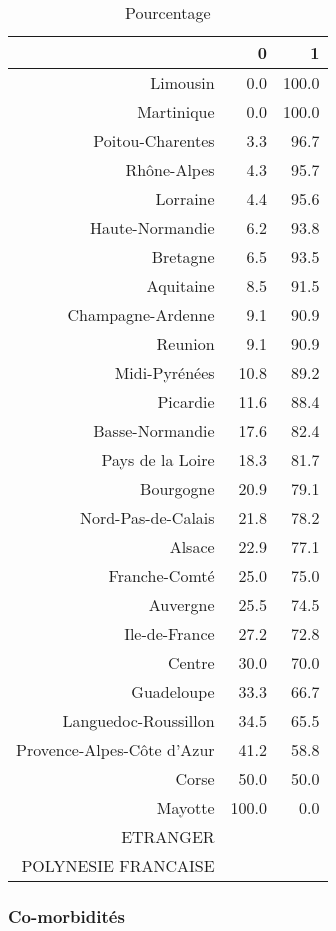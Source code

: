 \documentclass[11pt,a4paper]{article}\usepackage[]{graphicx}\usepackage[]{color}
\begin{document}
\begin{table}[H]
\centering
\begin{tabular}{rrr}
  \hline
 & 0 & 1 \\ 
  \hline
Limousin & 0.0 & 100.0 \\ 
  Martinique & 0.0 & 100.0 \\ 
  Poitou-Charentes & 3.3 & 96.7 \\ 
  Rhône-Alpes & 4.3 & 95.7 \\ 
  Lorraine & 4.4 & 95.6 \\ 
  Haute-Normandie & 6.2 & 93.8 \\ 
  Bretagne & 6.5 & 93.5 \\ 
  Aquitaine & 8.5 & 91.5 \\ 
  Champagne-Ardenne & 9.1 & 90.9 \\ 
  Reunion & 9.1 & 90.9 \\ 
  Midi-Pyrénées & 10.8 & 89.2 \\ 
  Picardie & 11.6 & 88.4 \\ 
  Basse-Normandie & 17.6 & 82.4 \\ 
  Pays de la Loire & 18.3 & 81.7 \\ 
  Bourgogne & 20.9 & 79.1 \\ 
  Nord-Pas-de-Calais & 21.8 & 78.2 \\ 
  Alsace & 22.9 & 77.1 \\ 
  Franche-Comté & 25.0 & 75.0 \\ 
  Auvergne & 25.5 & 74.5 \\ 
  Ile-de-France & 27.2 & 72.8 \\ 
  Centre & 30.0 & 70.0 \\ 
  Guadeloupe & 33.3 & 66.7 \\ 
  Languedoc-Roussillon & 34.5 & 65.5 \\ 
  Provence-Alpes-Côte d'Azur & 41.2 & 58.8 \\ 
  Corse & 50.0 & 50.0 \\ 
  Mayotte & 100.0 & 0.0 \\ 
  ETRANGER &  &  \\ 
  POLYNESIE FRANCAISE &  &  \\ 
   \hline
\end{tabular}
\caption{Pourcentage} 
\end{table}



      \subsubsection{Co-morbidités}
\end{document}
